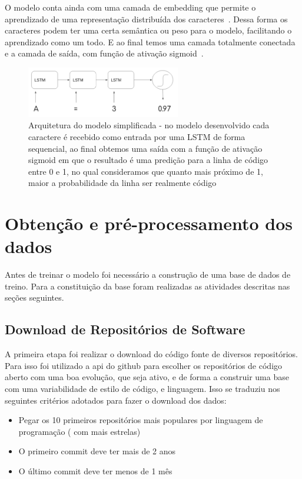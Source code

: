 \documentclass[12pt]{article}
\begin{document}
O modelo conta ainda com uma camada de embedding que permite o aprendizado de uma representação
distribuída dos caracteres~\cite{mikolov2013distributed}. Dessa forma os caracteres podem ter uma
certa semântica ou peso para o modelo, facilitando o aprendizado como um todo. E ao final temos
uma camada totalmente conectada e a camada de saída, com função de ativação sigmoid~\cite{zurada1992introduction}.

\begin{figure}[ht]
  \centering
  \includegraphics[width=0.6\textwidth]{../images/simple-model.png}
  \caption{ Arquitetura do modelo simplificada - no modelo desenvolvido cada 
  caractere é recebido como entrada por uma LSTM de forma sequencial, ao final
  obtemos uma saída com a função de ativação sigmoid em que o resultado é uma 
  predição para a linha de código entre 0 e 1, no qual consideramos que quanto
  mais próximo de 1, maior a probabilidade da linha ser realmente código}
  \label{fig:simple-model}
\end{figure}

\section{Obtenção e pré-processamento dos dados} \label{sec:dev}

Antes de treinar o modelo foi necessário a construção de uma base de dados de
treino. Para a constituição da base foram realizadas as atividades descritas 
nas seções seguintes.

\subsection{Download de Repositórios de Software}
A primeira etapa foi realizar o download do código fonte de diversos repositórios.
Para isso foi utilizado a api do github para escolher os repositórios de
código aberto com uma boa evolução, que seja ativo, e de forma a construir uma base
com uma variabilidade de estilo de código, e linguagem. 
Isso se traduziu nos seguintes critérios adotados para fazer o download dos dados:
\begin{itemize}
  \item Pegar os 10 primeiros repositórios mais populares por
  linguagem de  programação ( com mais estrelas)
  \item O primeiro commit deve ter mais de 2 anos
  \item O último commit deve ter menos de 1 mês
\end{itemize} 
\end{document}
